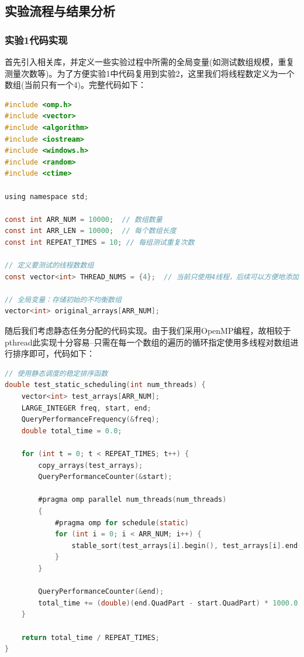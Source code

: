 \documentclass{nku}
\begin{document}
\subsection{实验流程与结果分析}
\subsubsection{实验1代码实现}
首先引入相关库，并定义一些实验过程中所需的全局变量(如测试数组规模，重复测量次数等)。为了方便实验1中代码复用到实验2，这里我们将线程数定义为一个数组(当前只有一个4)。完整代码如下：
\begin{lstlisting}[language=C]
#include <omp.h>
#include <vector>
#include <algorithm>
#include <iostream>
#include <windows.h>
#include <random>
#include <ctime>

using namespace std;

const int ARR_NUM = 10000;  // 数组数量
const int ARR_LEN = 10000;  // 每个数组长度
const int REPEAT_TIMES = 10; // 每组测试重复次数

// 定义要测试的线程数数组
const vector<int> THREAD_NUMS = {4};  // 当前只使用4线程，后续可以方便地添加其他线程数

// 全局变量：存储初始的不均衡数组
vector<int> original_arrays[ARR_NUM];
\end{lstlisting}

随后我们考虑静态任务分配的代码实现。由于我们采用OpenMP编程，故相较于pthread此实现十分容易--只需在每一个数组的遍历的循环指定使用多线程对数组进行排序即可，代码如下：
\begin{lstlisting}[language=C]
// 使用静态调度的稳定排序函数
double test_static_scheduling(int num_threads) {
    vector<int> test_arrays[ARR_NUM];
    LARGE_INTEGER freq, start, end;
    QueryPerformanceFrequency(&freq);
    double total_time = 0.0;

    for (int t = 0; t < REPEAT_TIMES; t++) {
        copy_arrays(test_arrays);
        QueryPerformanceCounter(&start);

        #pragma omp parallel num_threads(num_threads)
        {
            #pragma omp for schedule(static)
            for (int i = 0; i < ARR_NUM; i++) {
                stable_sort(test_arrays[i].begin(), test_arrays[i].end());
            }
        }

        QueryPerformanceCounter(&end);
        total_time += (double)(end.QuadPart - start.QuadPart) * 1000.0 / freq.QuadPart;
    }

    return total_time / REPEAT_TIMES;
}
\end{lstlisting}
\end{document}

